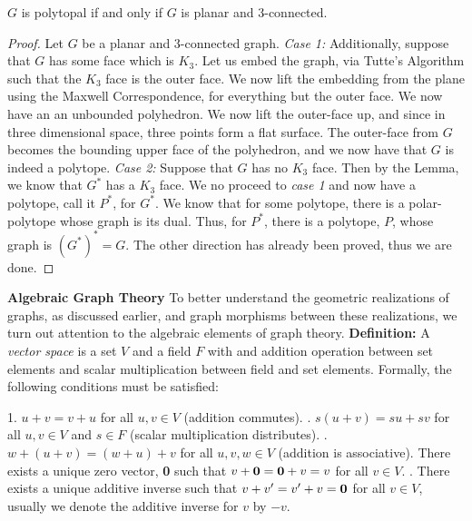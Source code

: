\documentclass{article}
\begin{document}
  \begin{theorem}
    $G$ is polytopal if and only if $G$ is planar and 3-connected.
  \end{theorem}
  \begin{proof}
    Let $G$ be a planar and 3-connected graph. 
    \smallskip \newline \noindent \textit{Case 1:} Additionally, suppose that $G$ has some face which is $K_3$. Let us embed the graph, via Tutte's Algorithm such that the $K_3$ face is the outer face. We now lift the embedding from the plane using the Maxwell Correspondence, for everything but the outer face. We now have an an unbounded polyhedron. We now lift the outer-face up, and since in three dimensional space, three points form a flat surface. The outer-face from $G$ becomes the bounding upper face of the polyhedron, and we now have that $G$ is indeed a polytope.
    \smallskip \newline \noindent \textit{Case 2:} Suppose that $G$ has no $K_3$ face. Then by the Lemma, we know that $G^*$ has a $K_3$ face. We no proceed to \textit{case 1} and now have a polytope, call it $P^*$, for $G^*$. We know that for some polytope, there is a polar-polytope whose graph is its dual. Thus, for $P^*$, there is a polytope, $P$, whose graph is $(G^*)^* = G$. 
    \newline \noindent The other direction has already been proved, thus we are done. 
  \end{proof}

 \bigskip \noindent \textbf{Algebraic Graph Theory}
 \newline \noindent To better understand the geometric realizations of graphs, as discussed earlier, and graph morphisms between these realizations, we turn out attention to the algebraic elements of graph theory. 
 \smallskip \newline \noindent \textbf{Definition:} A \textit{vector space} is a set $V$ and a field $F$ with and addition operation between set elements and scalar multiplication between field and set elements. Formally, the following conditions must be satisfied: 
 \begin{adjustwidth}{2.5em}{0pt}
 1. $u+v=v+u$ for all $u,v \in V$ (addition commutes).
 . $s(u+v)=su+sv$ for all $u,v \in V$ and $s \in F$ (scalar multiplication distributes).
 . $w+(u+v)=(w+u)+v$ for all $u,v,w \in V$ (addition is associative).
 \newline There exists a unique zero vector, \textbf{0} such that $v+\text{\textbf{0}}=\text{\textbf{0}}+v=v$ for all $v \in V$.
 \newline {}. There exists a unique additive inverse such that $v+v' = v'+v=\text{\textbf{0}}$ for all $v \in V$, usually we denote the additive inverse for $v$ by $-v$.
\end{adjustwidth}
\end{document}
